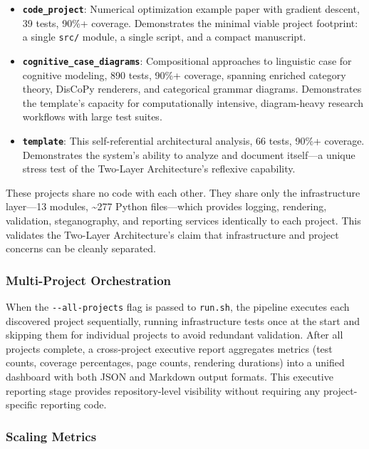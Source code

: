 \documentclass[
]{article}
\providecommand{\tightlist}{%
  \setlength{\itemsep}{0pt}\setlength{\parskip}{0pt}}
\begin{document}
\begin{itemize}
\tightlist
\item
  \textbf{\texttt{code\_project}}: Numerical optimization example paper
  with gradient descent, 39 tests, 90\%+ coverage. Demonstrates the
  minimal viable project footprint: a single \texttt{src/} module, a
  single script, and a compact manuscript.
\item
  \textbf{\texttt{cognitive\_case\_diagrams}}: Compositional approaches
  to linguistic case for cognitive modeling, 890 tests, 90\%+ coverage,
  spanning enriched category theory, DisCoPy renderers, and categorical
  grammar diagrams. Demonstrates the template's capacity for
  computationally intensive, diagram-heavy research workflows with large
  test suites.
\item
  \textbf{\texttt{template}}: This self-referential architectural
  analysis, 66 tests, 90\%+ coverage. Demonstrates the system's ability
  to analyze and document itself---a unique stress test of the Two-Layer
  Architecture's reflexive capability.
\end{itemize}

These projects share no code with each other. They share only the
infrastructure layer---13 modules, \textasciitilde277 Python
files---which provides logging, rendering, validation, steganography,
and reporting services identically to each project. This validates the
Two-Layer Architecture's claim that infrastructure and project concerns
can be cleanly separated.

\subsubsection{Multi-Project
Orchestration}\label{multi-project-orchestration}

When the \texttt{-\/-all-projects} flag is passed to \texttt{run.sh},
the pipeline executes each discovered project sequentially, running
infrastructure tests once at the start and skipping them for individual
projects to avoid redundant validation. After all projects complete, a
cross-project executive report aggregates metrics (test counts, coverage
percentages, page counts, rendering durations) into a unified dashboard
with both JSON and Markdown output formats. This executive reporting
stage provides repository-level visibility without requiring any
project-specific reporting code.

\subsubsection{Scaling Metrics}\label{scaling-metrics}
\end{document}
